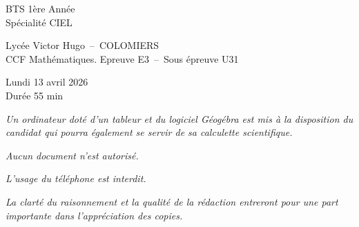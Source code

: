 \thispagestyle{empty}
    \begin{minipage}{0.2\linewidth}
    \begin{tcolorbox}[colback=white, title=, width=1\linewidth]	
        BTS 1ère Année \\
        Spécialité CIEL 
    \end{tcolorbox}
\end{minipage}\hfill
\begin{minipage}{0.54\linewidth}
    \begin{tcolorbox}[colback=white, title=, width=1\linewidth]	
        \begin{center}
            Lycée Victor Hugo~--~COLOMIERS \\
            CCF Mathématiques. Epreuve E3~--~Sous épreuve U31 
        \end{center}
        
    \end{tcolorbox}
\end{minipage}\hfill
\begin{minipage}{0.25\linewidth}
    \begin{tcolorbox}[colback=white, title=, width=1\linewidth]	
        \begin{center}
            Lundi 13 avril 2026 \\
    Durée 55 min
        \end{center}
        
    \end{tcolorbox}
\end{minipage}\hfill

\vspace{2cm}

\NomPrenom{}

\vspace{2cm}

\begin{center}
    
\emph{Un ordinateur doté d'un tableur et du logiciel Géogébra est mis à la disposition du candidat qui pourra également se servir de sa calculette scientifique.}

\bigskip

\emph{Aucun document n'est autorisé.}

\bigskip

\emph{L'usage du téléphone est interdit.}

\bigskip

\emph{La clarté du raisonnement et la qualité de la rédaction entreront pour une part importante dans l'appréciation des copies.}

\end{center}

